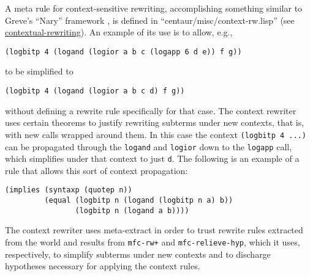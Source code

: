 A meta rule for context-sensitive rewriting, accomplishing something
similar to Greve's ``Nary'' framework \cite{greve06}, is defined in
``centaur/misc/context-rw.lisp'' (see
\href{http://www.cs.utexas.edu/users/moore/acl2/manuals/current/manual/index.html?topic=ACL2\_\_\_\_CONTEXTUAL-REWRITING}{\underline{contextual-rewriting}}).  An example of its use is to allow, e.g.,
\begin{verbatim}
(logbitp 4 (logand (logior a b c (logapp 6 d e)) f g))
\end{verbatim}
\noindent to be simplified to
\begin{verbatim}
(logbitp 4 (logand (logior a b c d) f g))
\end{verbatim}
without defining a rewrite rule specifically for that case. The
context rewriter uses certain theorems to justify rewriting subterms
under new contexts, that is, with new calls wrapped around them.  In
this case the context \texttt{(logbitp 4 ...)} can be propagated
through the \texttt{logand} and \texttt{logior} down to the
\texttt{logapp} call, which simplifies under that context to just
\texttt{d}.  The following is an example of a rule that allows this
sort of context propagation:
\begin{verbatim}
(implies (syntaxp (quotep n))
         (equal (logbitp n (logand (logbitp n a) b))
                (logbitp n (logand a b))))
\end{verbatim}

\begin{comment}
[From Matt] I'm not sure if I'm following what's above.  At first it
seemed to me that the displayed rule is intended to explain how
contexts are propagated in the logbitp example above.  Now I think
(but I'm not sure) that it's just an analogous sort of rule, but we'd
need for example to propagate into logior expressions to do that
logbitp example.  Can you clarify a bit?
\end{comment}

The context rewriter uses meta-extract in order to trust rewrite rules
extracted from the world and results from \texttt{mfc-rw+} and
\texttt{mfc-relieve-hyp}, which it uses, respectively, to simplify
subterms under new contexts and to discharge hypotheses necessary for
applying the context rules.

\begin{comment}
[From Matt] I haven't given the following any thought at all, but I
wonder if patterned congruences could provide an alternate solution.
Maybe that doesn't matter, but if offhand you (Sol) think so, you
could add such words and reference the ITP 2014 paper on patterned
congruences (I'll send you a reference if you ask).
\end{comment}

